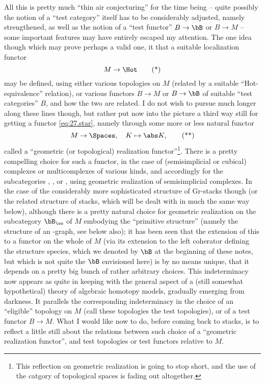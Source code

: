 \label{sec:27}%
All this is pretty much ``thin air conjecturing'' for the time being
-- quite possibly the notion of a ``test category'' itself has to be
considerably adjusted, namely strengthened, as well as the notion of a
``test functor'' $B \to \bB$ or $B \to M$ -- some important features
may have entirely escaped my attention. The one idea though which may
prove perhaps a valid one, it that a suitable localization functor
\begin{equation}
  \label{eq:27.star}
  M \to \Hot \tag{*}
\end{equation}
may be defined, using either various topologies on $M$ (related by a
suitable ``Hot-equivalence'' relation), or various functors $B \to M$
or $B \to \bB$ of suitable ``test categories'' $B$, and how the two
are related. I do not wish to pursue much longer along these lines
though, but rather put now into the picture a third way still for
getting a functor \eqref{eq:27.star}, namely through some more or less
natural functor
\begin{equation}
  \label{eq:27.starstar}
  M \to \Spaces, \quad K \mapsto \abs K, \tag{**}
\end{equation}
called a ``geometric (or topological) realization functor''\footnote{This reflection on geometric realization is going to stop short, and the use of the catgory of topological spaces is fading out altogether.}. There is
a pretty compelling choice for such a functor, in the case of
(semisimplicial or cubical) complexes or multicomplexes of various
kinds, and accordingly for the subcategories \Cat, \Preord, \Ord{} or
\Sssets, using geometric realization of semisimplicial complexes. In
the case of the considerably more sophisticated structure of Gr-stacks
though (or the related structure of stacks, which will be dealt
with in much the same way below), although there is a pretty natural
choice for geometric realization on the subcategory $\bB_\oo$ of $M$
embodying the ``primitive structure'' (namely the structure of an
\oo-graph, see below also); it has been seen that the extension of
this to a functor on the whole of $M$ (via its extension to the left
coherator defining the structure species, which we denoted by $\bB$ at
the beginning of these notes, but which is not quite the $\bB$
envisioned here) is by no means unique, that it depends on a pretty
big bunch of rather arbitrary choices. This indeterminacy now appears
as quite in keeping with the general aspect of a (still somewhat
hypothetical) theory of algebraic homotopy models, gradually emerging
from darkness. It parallels the corresponding indeterminacy in the
choice of an ``eligible'' topology on $M$ (call these topologies the
test topologies), or of a test functor $B \to M$. What I would like
now to do, before coming back to stacks, is to reflect a little still
about the relations between such choice of a ``geometric realization
functor'', and test topologies or test functors relative to $M$.

